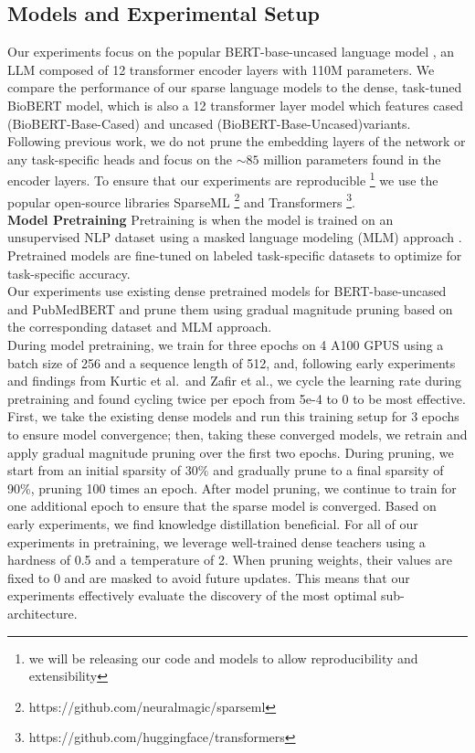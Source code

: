 \documentclass[10pt]{article}
\begin{document}
\subsection{Models and Experimental Setup}
Our experiments focus on the popular BERT-base-uncased language model \cite{Devlin2019BERTPO}, an LLM composed of 12 transformer encoder layers with 110M parameters. We compare the performance of our sparse language models to the dense, task-tuned BioBERT model, which is also a 12 transformer layer model which features cased (BioBERT-Base-Cased) and uncased (BioBERT-Base-Uncased)variants. Following previous work, we do not prune the embedding layers of the network or any task-specific heads and focus on the $\sim\!85$ million parameters found in the encoder layers. To ensure that our experiments are reproducible \footnote{we will be releasing our code and models to allow reproducibility and extensibility} we use the popular open-source libraries SparseML \footnote{https://github.com/neuralmagic/sparseml} and Transformers \footnote{https://github.com/huggingface/transformers}. \\
\textbf{Model Pretraining}
Pretraining is when the model is trained on an unsupervised NLP dataset using a masked language modeling (MLM) approach \cite{Devlin2019BERTPO}. Pretrained models are fine-tuned on labeled task-specific datasets to optimize for task-specific accuracy.\\
Our experiments use existing dense pretrained models for BERT-base-uncased \cite{Devlin2019BERTPO} and PubMedBERT \cite{Gu2022DomainSpecificLM} and prune them using gradual magnitude pruning based on the corresponding dataset and MLM approach. \\
During model pretraining, we train for three epochs on 4 A100 GPUS using a batch size of 256 and a sequence length of 512, and, following early experiments and findings from Kurtic et al.\ and Zafir et al., we cycle the learning rate during pretraining and found cycling twice per epoch from 5e-4 to 0 to be most effective. First, we take the existing dense models and run this training setup for 3 epochs to ensure model convergence; then, taking these converged models, we retrain and apply gradual magnitude pruning over the first two epochs. During pruning, we start from an initial sparsity of $30\%$ and gradually prune to a final sparsity of 90\%, pruning 100 times an epoch. After model pruning, we continue to train for one additional epoch to ensure that the sparse model is converged. 
Based on early experiments, we find knowledge distillation beneficial. For all of our experiments in pretraining, we leverage well-trained dense teachers using a hardness of  0.5 and a temperature of 2. When pruning weights, their values are fixed to 0 and are masked to avoid future updates. This means that our experiments effectively evaluate the discovery of the most optimal sub-architecture.
\end{document}
